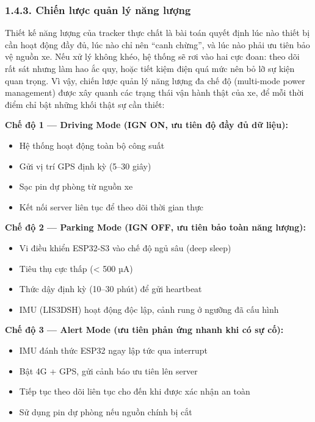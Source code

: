 \documentclass[a4paper]{extarticle}
\providecommand{\tightlist}{%
  \setlength{\itemsep}{0pt}\setlength{\parskip}{0pt}}
\begin{document}
\subsubsection{1.4.3. Chiến lược quản lý năng
lượng}\label{143-chiux1ebfn-lux1b0ux1ee3c-quux1ea3n-luxfd-nux103ng-lux1b0ux1ee3ng}

Thiết kế năng lượng của tracker thực chất là bài toán quyết định lúc nào
thiết bị cần hoạt động đầy đủ, lúc nào chỉ nên ``canh chừng'', và lúc nào
phải ưu tiên bảo vệ nguồn xe. Nếu xử lý không khéo, hệ thống sẽ rơi vào
hai cực đoan: theo dõi rất sát nhưng làm hao ắc quy, hoặc tiết kiệm điện
quá mức nên bỏ lỡ sự kiện quan trọng. Vì vậy, chiến lược quản lý năng
lượng đa chế độ (multi-mode power management) được xây quanh các trạng
thái vận hành thật của xe, để mỗi thời điểm chỉ bật những khối thật sự
cần thiết:

\textbf{Chế độ 1 --- Driving Mode (IGN ON, ưu tiên độ đầy đủ dữ liệu):}

\begin{itemize}
\tightlist
\item
  Hệ thống hoạt động toàn bộ công suất
\item
  Gửi vị trí GPS định kỳ (5--30 giây)
\item
  Sạc pin dự phòng từ nguồn xe
\item
  Kết nối server liên tục để theo dõi thời gian thực
\end{itemize}

\textbf{Chế độ 2 --- Parking Mode (IGN OFF, ưu tiên bảo toàn năng lượng):}

\begin{itemize}
\tightlist
\item
  Vi điều khiển ESP32-S3 vào chế độ ngủ sâu (deep sleep)
\item
  Tiêu thụ cực thấp (\textless{} 500 µA)
\item
  Thức dậy định kỳ (10--30 phút) để gửi heartbeat
\item
  IMU (LIS3DSH) hoạt động độc lập, cảnh rung ở ngưỡng đã cấu hình
\end{itemize}

\textbf{Chế độ 3 --- Alert Mode (ưu tiên phản ứng nhanh khi có sự cố):}

\begin{itemize}
\tightlist
\item
  IMU đánh thức ESP32 ngay lập tức qua interrupt
\item
  Bật 4G + GPS, gửi cảnh báo ưu tiên lên server
\item
  Tiếp tục theo dõi liên tục cho đến khi được xác nhận an toàn
\item
  Sử dụng pin dự phòng nếu nguồn chính bị cắt
\end{itemize}
\end{document}

